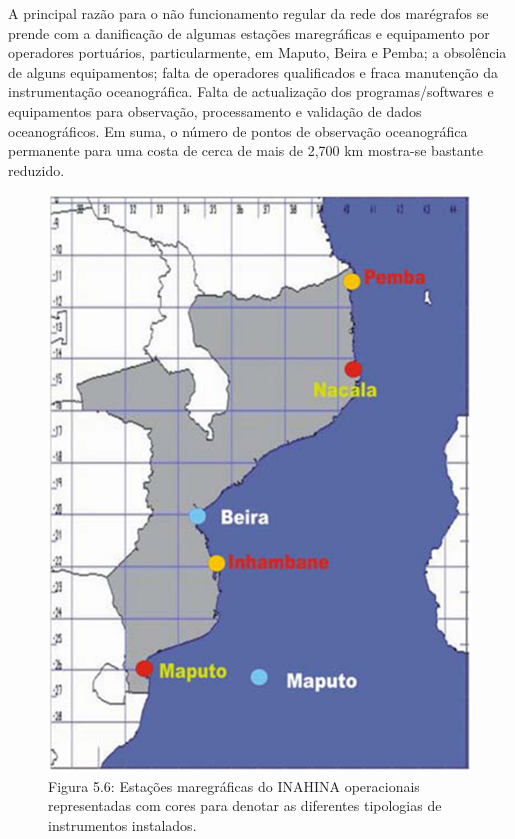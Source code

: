 \documentclass[
]{book}
\begin{document}
A principal razão para o não funcionamento regular da rede dos marégrafos se prende com a danificação de algumas estações maregráficas e equipamento por operadores portuários, particularmente, em Maputo, Beira e Pemba; a obsolência de alguns equipamentos; falta de operadores qualificados e fraca manutenção da instrumentação oceanográfica. Falta de actualização dos programas/softwares e equipamentos para observação, processamento e validação de dados oceanográficos. Em suma, o número de pontos de observação oceanográfica permanente para uma costa de cerca de mais de 2,700 km mostra-se bastante reduzido.

\begin{figure}
\centering
\includegraphics{images/maregraficas_INAHINA.png}
\caption{Figura 5.6: Estações maregráficas do INAHINA operacionais representadas com cores para denotar as diferentes tipologias de instrumentos instalados.}
\end{figure}
\end{document}
